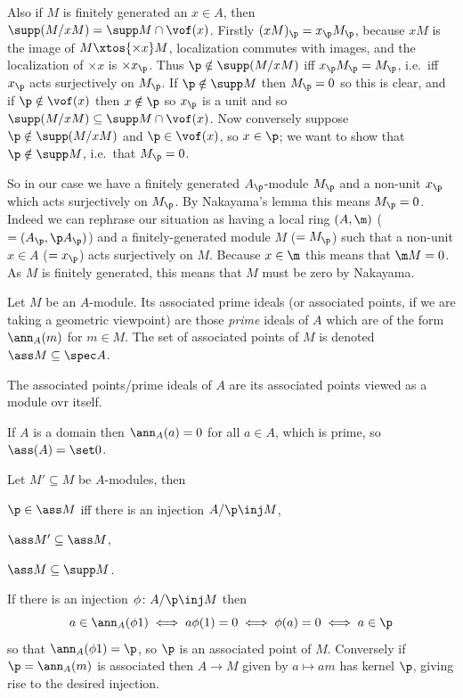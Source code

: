 Also if $M$ is finitely generated an $x\in A$, then $\supp(M/xM)=\supp M\cap\vof(x)$.
Firstly $(xM)_\p=x_\p M_\p$, because $xM$ is the image of $M\xtos{\times x}M$, localization commutes with images, and the localization of $\times x$ is $\times x_\p$.
Thus $\p\notin\supp(M/xM)$ iff $x_\p M_\p=M_\p$, i.e.\ iff $x_\p$ acts surjectively on $M_\p$.
If $\p\notin\supp M$ then $M_\p=0$ so this is clear, and if $\p\notin\vof(x)$ then $x\notin\p$ so $x_\p$ is a unit and so $\supp(M/xM)\subseteq\supp M\cap\vof(x)$.
Now conversely suppose $\p\notin\supp(M/xM)$ and $\p\in\vof(x)$, so $x\in\p$; we want to show that $\p\notin\supp M$, i.e.\ that $M_\p=0$.

So in our case we have a finitely generated $A_\p$-module $M_\p$ and a non-unit $x_\p$ which acts surjectively on $M_\p$.
By Nakayama's lemma this means $M_\p=0$.
Indeed we can rephrase our situation as having a local ring $(A,\m)$ ($=(A_\p,\p A_\p)$) and a finitely-generated module $M$ ($=M_\p$) such that a non-unit
$x\in A$ ($=x_\p$) acts surjectively on $M$.
Because $x\in\m$ this means that $\m M=0$.
As $M$ is finitely generated, this means that $M$ must be zero by Nakayama.

\bdefn

    Let $M$ be an $A$-module.
    Its {\emphcolor associated prime ideals} (or {\emphcolor associated points}, if we are taking a geometric viewpoint) are those {\it prime\/} ideals of $A$ which are of the
    form $\ann_A(m)$ for $m\in M$.
    The set of associated points of $M$ is denoted $\ass M\subseteq\spec A$.

    The associated points/prime ideals of $A$ are its associated points viewed as a module ovr itself.

\edefn

If $A$ is a domain then $\ann_A(a)=0$ for all $a\in A$, which is prime, so $\ass(A)=\set0$.

\blemm

    Let $M'\subseteq M$ be $A$-modules, then
    \benum
        \item $\p\in\ass M$ iff there is an injection $A/\p\inj M$,
        \item $\ass M'\subseteq\ass M$,
        \item $\ass M\subseteq\supp M$.
    \eenum

\elemm

\bproof

    If there is an injection $\phi\colon A/\p\inj M$ then
    $$ a\in\ann_A(\phi1) \iff a\phi(1) = 0 \iff \phi(a) = 0 \iff a\in\p $$
    so that $\ann_A(\phi1)=\p$, so $\p$ is an associated point of $M$.
    Conversely if $\p=\ann_A(m)$ is associated then $A\to M$ given by $a\mapsto am$ has kernel $\p$, giving rise to the desired injection.

